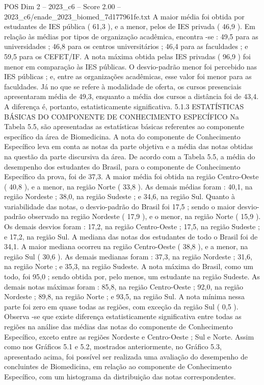 \begin{textsample}{POS Dim 2 – 2023\_c6 – Score 2.00 – 2023\_c6/enade\_2023\_biomed\_7d177961fe.txt}
A maior média foi obtida por estudantes de IES pública ( 61,3 ), e a menor, pelos de IES privada ( 46,9 ).
Em relação às médias por tipos de organização acadêmica, encontra -se : 49,5 para as universidades ; 46,8 para os centros universitários ; 46,4 para as faculdades ; e 59,5 para os CEFET/IF.
A nota máxima obtida pelas IES privadas ( 96,9 ) foi menor em comparação às IES públicas.
O desvio-padrão menor foi percebido nas IES públicas ; e, entre as organizações acadêmicas, esse valor foi menor para as faculdades.
Já no que se refere à modalidade de oferta, os cursos presenciais apresentaram média de 49,3, enquanto a média dos cursos a distância foi de 43,4.
A diferença é, portanto, estatisticamente significativa. 5.1.3 ESTATÍSTICAS BÁSICAS DO COMPONENTE DE CONHECIMENTO ESPECÍFICO Na Tabela 5.5, são apresentadas as estatísticas básicas referentes ao componente específico da área de Biomedicina.
A nota do componente de Conhecimento Específico leva em conta as notas da parte objetiva e a média das notas obtidas na questão da parte discursiva da área.
De acordo com a Tabela 5.5, a média do desempenho dos estudantes do Brasil, para o componente de Conhecimento Específico da prova, foi de 37,3.
A maior média foi obtida na região Centro-Oeste ( 40,8 ), e a menor, na região Norte ( 33,8 ).
As demais médias foram : 40,1, na região Nordeste ; 38,0, na região Sudeste ; e 34,6, na região Sul.
Quanto à variabilidade das notas, o desvio-padrão do Brasil foi 17,5 ; sendo o maior desvio-padrão observado na região Nordeste ( 17,9 ), e o menor, na região Norte ( 15,9 ).
Os demais desvios foram : 17,2, na região Centro-Oeste ; 17,5, na região Sudeste ; e 17,2, na região Sul.
A mediana das notas dos estudantes de todo o Brasil foi de 34,1.
A maior mediana ocorreu na região Centro-Oeste ( 38,8 ), e a menor, na região Sul ( 30,6 ).
As demais medianas foram : 37,3, na região Nordeste ; 31,6, na região Norte ; e 35,3, na região Sudeste.
A nota máxima do Brasil, como um todo, foi 95,0 ; sendo obtida por, pelo menos, um estudante na região Sudeste.
As demais notas máximas foram : 85,8, na região Centro-Oeste ; 92,0, na região Nordeste ; 89,8, na região Norte ; e 93,5, na região Sul.
A nota mínima nessa parte foi zero em quase todas as regiões, com exceção da região Sul ( 0,5 ).
Observa -se que existe diferença estatisticamente significativa entre todas as regiões na análise das médias das notas do componente de Conhecimento Específico, exceto entre as regiões Nordeste e Centro-Oeste ; Sul e Norte.
Assim como nos Gráficos 5.1 e 5.2, mostrados anteriormente, no Gráfico 5.3, apresentado acima, foi possível ser realizada uma avaliação do desempenho de concluintes de Biomedicina, em relação ao componente de Conhecimento Específico, com um histograma da distribuição das notas correspondentes.

\end{textsample}
